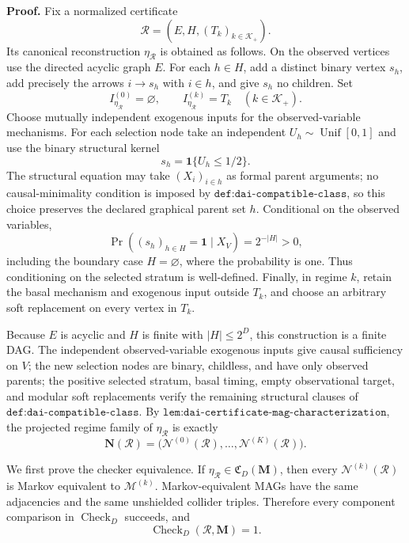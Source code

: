 \textbf{Proof.}
Fix a normalized certificate
\[
\mathcal R=(E,H,(T_k)_{k\in\mathcal K_+}).
\]
Its canonical reconstruction \(\eta_{\mathcal R}\) is obtained as follows.  On the observed vertices use the directed acyclic graph \(E\).  For each \(h\in H\), add a distinct binary vertex \(s_h\), add precisely the arrows \(i\to s_h\) with \(i\in h\), and give \(s_h\) no children.  Set
\[
I_{\eta_{\mathcal R}}^{(0)}=\varnothing,
\qquad
I_{\eta_{\mathcal R}}^{(k)}=T_k
\quad(k\in\mathcal K_+).
\]
Choose mutually independent exogenous inputs for the observed-variable mechanisms.  For each selection node take an independent \(U_h\sim\operatorname{Unif}[0,1]\) and use the binary structural kernel
\[
s_h=\mathbf 1\{U_h\le 1/2\}.
\]
The structural equation may take \((X_i)_{i\in h}\) as formal parent arguments; no causal-minimality condition is imposed by \(\texttt{def:dai-compatible-class}\), so this choice preserves the declared graphical parent set \(h\).  Conditional on the observed variables,
\[
\Pr\!\left((s_h)_{h\in H}=\mathbf 1\mid X_V\right)=2^{-|H|}>0,
\]
including the boundary case \(H=\varnothing\), where the probability is one.  Thus conditioning on the selected stratum is well-defined.  Finally, in regime \(k\), retain the basal mechanism and exogenous input outside \(T_k\), and choose an arbitrary soft replacement on every vertex in \(T_k\).

Because \(E\) is acyclic and \(H\) is finite with \(|H|\le 2^D\), this construction is a finite DAG.  The independent observed-variable exogenous inputs give causal sufficiency on \(V\); the new selection nodes are binary, childless, and have only observed parents; the positive selected stratum, basal timing, empty observational target, and modular soft replacements verify the remaining structural clauses of \(\texttt{def:dai-compatible-class}\).  By \(\texttt{lem:dai-certificate-mag-characterization}\), the projected regime family of \(\eta_{\mathcal R}\) is exactly
\[
\mathbf N(\mathcal R)
=\bigl(\mathcal N^{(0)}(\mathcal R),\ldots,\mathcal N^{(K)}(\mathcal R)\bigr).
\]

We first prove the checker equivalence.  If \(\eta_{\mathcal R}\in\mathfrak C_D(\mathbf M)\), then every \(\mathcal N^{(k)}(\mathcal R)\) is Markov equivalent to \(\mathcal M^{(k)}\).  Markov-equivalent MAGs have the same adjacencies and the same unshielded collider triples.  Therefore every component comparison in \(\operatorname{Check}_{D}\) succeeds, and
\[
\operatorname{Check}_{D}(\mathcal R,\mathbf M)=1.
\]

